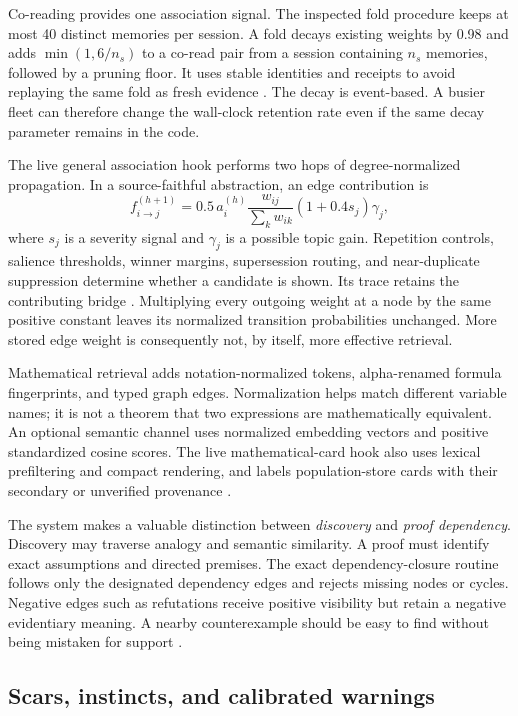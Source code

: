 Co-reading provides one association signal. The inspected fold procedure keeps at most 40 distinct memories per session. A fold decays existing weights by 0.98 and adds $\min(1,6/n_s)$ to a co-read pair from a session containing $n_s$ memories, followed by a pruning floor. It uses stable identities and receipts to avoid replaying the same fold as fresh evidence \citep{coactivation}. The decay is event-based. A busier fleet can therefore change the wall-clock retention rate even if the same decay parameter remains in the code.

The live general association hook performs two hops of degree-normalized propagation. In a source-faithful abstraction, an edge contribution is
\[
f_{i\to j}^{(h+1)}
=0.5\,a_i^{(h)}
\frac{w_{ij}}{\sum_k w_{ik}}
(1+0.4s_j)\gamma_j,
\]
where $s_j$ is a severity signal and $\gamma_j$ is a possible topic gain. Repetition controls, salience thresholds, winner margins, supersession routing, and near-duplicate suppression determine whether a candidate is shown. Its trace retains the contributing bridge \citep{spread}. Multiplying every outgoing weight at a node by the same positive constant leaves its normalized transition probabilities unchanged. More stored edge weight is consequently not, by itself, more effective retrieval.

Mathematical retrieval adds notation-normalized tokens, alpha-renamed formula fingerprints, and typed graph edges. Normalization helps match different variable names; it is not a theorem that two expressions are mathematically equivalent. An optional semantic channel uses normalized embedding vectors and positive standardized cosine scores. The live mathematical-card hook also uses lexical prefiltering and compact rendering, and labels population-store cards with their secondary or unverified provenance \citep{mathretrieval,semantic,mathsense}.

The system makes a valuable distinction between \emph{discovery} and \emph{proof dependency}. Discovery may traverse analogy and semantic similarity. A proof must identify exact assumptions and directed premises. The exact dependency-closure routine follows only the designated dependency edges and rejects missing nodes or cycles. Negative edges such as refutations receive positive visibility but retain a negative evidentiary meaning. A nearby counterexample should be easy to find without being mistaken for support \citep{matharchitecture}.

\subsection{Scars, instincts, and calibrated warnings}

